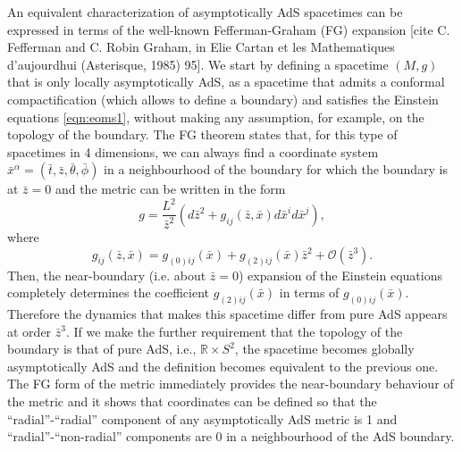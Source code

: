 \documentclass[a4paper,11pt]{article}
\numberwithin{equation}{section}
\begin{document}
An equivalent characterization of asymptotically AdS spacetimes can be expressed in terms of the well-known Fefferman-Graham (FG) expansion [cite C. Fefferman and C. Robin Graham, in Elie Cartan et les Mathematiques d'aujourdhui (Asterisque, 1985) 95]. We start by defining a spacetime $(M,g)$  that is only locally asymptotically AdS, as a spacetime that admits a conformal compactification (which allows to define a boundary) and satisfies the Einstein equations \eqref{eqn:eoms1}, without making any assumption, for example, on the topology of the boundary. The FG theorem states that, for this type of spacetimes in 4 dimensions, we can always find a coordinate system $\bar{x}^\alpha=(\bar{t},\bar{z},\bar{\theta},\bar{\phi})$ in a neighbourhood of the boundary for which the boundary is at $\bar{z}=0$ and the metric can be written in the form
\begin{equation}
\label{eqn:FGmetric}
g=\frac{L^2}{\bar{z}^2}(d\bar{z}^2+g_{ij}(\bar{z},\bar{x})d\bar{x}^id\bar{x}^j),
\end{equation}
where 
\begin{equation}
\label{eqn:FGbdymetric}
g_{ij}(\bar{z},\bar{x})=g_{(0)ij}(\bar{x})+g_{(2)ij}(\bar{x})\bar{z}^2+\mathcal{O}(\bar{z}^3).
\end{equation}
Then, the near-boundary (i.e. about $\bar{z}=0$) expansion of the Einstein equations completely determines the coefficient $g_{(2)ij}(\bar{x})$ in terms of $g_{(0)ij}(\bar{x})$. Therefore the dynamics that makes this spacetime differ from pure AdS appears at order $\bar{z}^3$. If we make the further requirement that the topology of the boundary is that of pure AdS, i.e., $\mathbb{R}\times S^2$, the spacetime becomes globally asymptotically AdS and the definition becomes equivalent to the previous one. The FG form of the metric immediately provides the near-boundary behaviour of the metric and it shows that coordinates can be defined so that the ``radial''-``radial'' component of any asymptotically AdS metric is 1 and ``radial''-``non-radial'' components are 0 in a neighbourhood of the AdS boundary.
\end{document}
